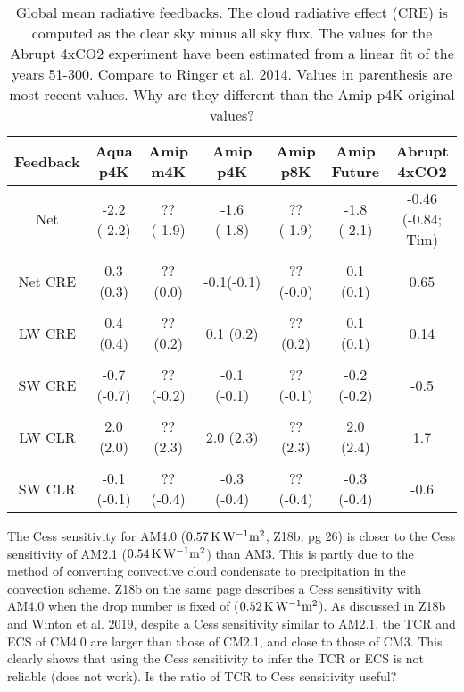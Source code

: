 \documentclass[11pt]{article}   	%
\begin{document}
\begin{table}
\begin{center}
\caption{Global mean radiative feedbacks.  The cloud radiative effect (CRE) is computed as
 the clear sky minus all sky flux. The values for the Abrupt 4xCO2 experiment
have been estimated from a linear fit of the years 51-300.  Compare to Ringer et al. 2014.
Values in parenthesis are most recent values.  Why are they different than the Amip p4K 
original values?}
    \begin{tabular}{*{7}{c}}
    \hline
    \hline
 Feedback & Aqua p4K & Amip m4K & Amip p4K &  Amip p8K & Amip Future & Abrupt 4xCO2    \\ \hline
    Net          &   -2.2 (-2.2) & ?? (-1.9)  &  -1.6 (-1.8)      & ?? (-1.9)      & -1.8 (-2.1)    &    -0.46 (-0.84; Tim)         \\ 
    \\
    Net CRE      & 0.3 (0.3)  & ?? (0.0)  & -0.1(-0.1)    & ?? (-0.0)         & 0.1 (0.1)          & 0.65   \\  
    \\
    LW CRE       & 0.4 (0.4)  & ?? (0.2)  & 0.1 (0.2)  & ?? (0.2)        & 0.1 (0.1)          & 0.14    \\  
    \\
    SW CRE      & -0.7 (-0.7) & ?? (-0.2) & -0.1 (-0.1)  & ?? (-0.1)      & -0.2 (-0.2)         & -0.5              \\  
    \\
    LW CLR       & 2.0 (2.0)  & ?? (2.3) & 2.0 (2.3)   & ??  (2.3)       & 2.0 (2.4)         & 1.7             \\  
    \\
    SW CLR      & -0.1 (-0.1)  & ?? (-0.4) & -0.3 (-0.4)    & ?? (-0.4)        & -0.3 (-0.4)          & -0.6                   \\  \hline

    \end{tabular}\par
    \label{tab:lambda}
\end{center}
\end{table}

The Cess sensitivity for AM4.0 ($0.57 \, \rm{K\, W^{-1} m^2}$, Z18b, pg 26) is closer to the Cess sensitivity 
of AM2.1 ($0.54 \, \rm{K\, W^{-1} m^2}$) than AM3.  This is partly due to the method of converting convective cloud condensate to precipitation 
in the convection scheme.   Z18b on the same page describes a Cess sensitivity with AM4.0 when the drop number
is fixed of ($0.52 \, \rm{K\, W^{-1} m^2}$).  As discussed in Z18b and Winton et al. 2019, despite a Cess sensitivity similar to AM2.1, 
the TCR and ECS of CM4.0 are larger than those of CM2.1, and close to those of CM3.   This clearly 
shows that using the Cess sensitivity to infer the TCR or ECS is not reliable (does not work).   Is the ratio of TCR to
Cess sensitivity useful?  
\end{document}
